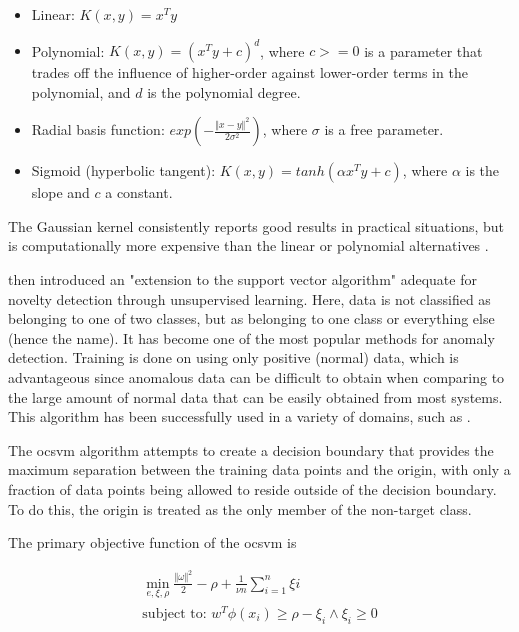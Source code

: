 \begin{itemize}
    \item Linear: $K(x, y) = x^Ty$
    \item Polynomial: $K(x, y) = (x^Ty + c)^d$, where $c>=0$  is a parameter that trades off the influence of higher-order against lower-order terms in the polynomial, and $d$ is the polynomial degree.
    \item Radial basis function: $exp(-\frac{\Vert x - y \Vert ^2}{2\sigma^2})$, where $\sigma$ is a free parameter.
    \item Sigmoid (hyperbolic tangent): $K(x, y) = tanh(\alpha x^Ty + c)$, where $\alpha$ is the slope and $c$ a constant.
\end{itemize}

The Gaussian kernel consistently reports good results in practical situations, but is computationally more expensive than the linear or polynomial alternatives \citep{bounsiar2014one}.\par

\cite{scholkopf1999} then introduced an "extension to the support vector algorithm" adequate for novelty detection through unsupervised learning. Here, data is not classified as belonging to one of two classes, but as belonging to one class or everything else (hence the name). It has become one of the most popular methods for anomaly detection. Training is done on using only positive (normal) data, which is advantageous since anomalous data can be difficult to obtain when comparing to the large amount of normal data that can be easily obtained from most systems. This algorithm has been successfully used in a variety of domains, such as \cite{tian2018ramp, miao2018distributed, amraee2018abnormal}.\par

The \gls{ocsvm} algorithm attempts to create a decision boundary that provides the maximum separation between the training data points and the origin, with only a fraction of data points being allowed to reside outside of the decision boundary. To do this, the origin is treated as the only member of the non-target class.\par

The primary objective function of the \gls{ocsvm} is

\begin{gather*}
\min_{e, \xi, \rho} \frac{\Vert \omega \Vert ^2}{2} - \rho + \frac{1}{\nu n} \sum_{i=1}^{n} \xi i \\ \text{subject to: } w^T \phi (x_i) \geq \rho - \xi_i \wedge \xi_i \geq 0
\end{gather*}

